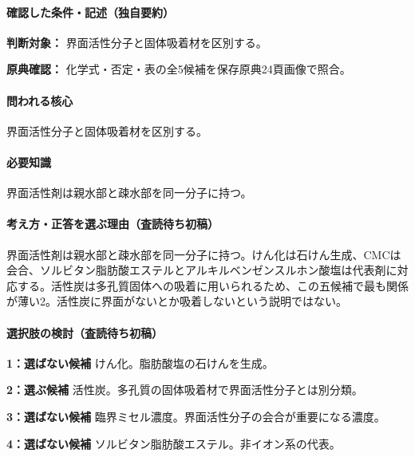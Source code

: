 \paragraph{確認した条件・記述（独自要約）}\mbox{}\par

\noindent\textbf{判断対象：} 界面活性分子と固体吸着材を区別する。\par

\noindent\textbf{原典確認：} 化学式・否定・表の全5候補を保存原典24頁画像で照合。\par

\paragraph{問われる核心} 界面活性分子と固体吸着材を区別する。

\paragraph{必要知識} 界面活性剤は親水部と疎水部を同一分子に持つ。

\paragraph{考え方・正答を選ぶ理由（査読待ち初稿）} 界面活性剤は親水部と疎水部を同一分子に持つ。けん化は石けん生成、CMCは会合、ソルビタン脂肪酸エステルとアルキルベンゼンスルホン酸塩は代表剤に対応する。活性炭は多孔質固体への吸着に用いられるため、この五候補で最も関係が薄い2。活性炭に界面がないとか吸着しないという説明ではない。

\paragraph{選択肢の検討（査読待ち初稿）}\mbox{}\par

\noindent\textbf{1：選ばない候補} けん化。脂肪酸塩の石けんを生成。\par

\noindent\textbf{2：選ぶ候補} 活性炭。多孔質の固体吸着材で界面活性分子とは別分類。\par

\noindent\textbf{3：選ばない候補} 臨界ミセル濃度。界面活性分子の会合が重要になる濃度。\par

\noindent\textbf{4：選ばない候補} ソルビタン脂肪酸エステル。非イオン系の代表。\par

